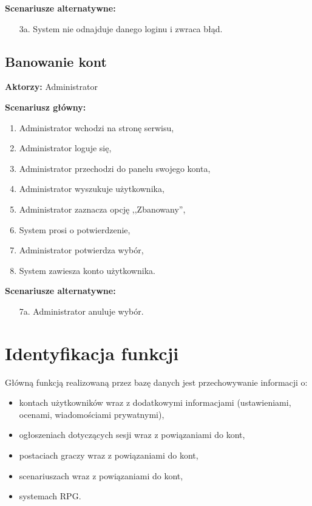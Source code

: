 \textbf{Scenariusze alternatywne:}
	\begin{enumerate}
	\item[3a.] System nie odnajduje danego loginu i zwraca błąd.
	\end{enumerate}

\subsection{Banowanie kont}

\textbf{Aktorzy:} Administrator

\textbf{Scenariusz główny:}
	\begin{enumerate}
	\item Administrator wchodzi na stronę serwisu,
	\item Administrator loguje się,
	\item Administrator przechodzi do panelu swojego konta,
	\item Administrator wyszukuje użytkownika,
	\item Administrator zaznacza opcję ,,Zbanowany'',
	\item System prosi o potwierdzenie,
	\item Administrator potwierdza wybór,	
	\item System zawiesza konto użytkownika.
	\end{enumerate}

\textbf{Scenariusze alternatywne:}
	\begin{enumerate}
	\item[7a.] Administrator anuluje wybór.
	\end{enumerate}


\section{Identyfikacja funkcji}
\label{sec:idfun}

Główną funkcją realizowaną przez bazę danych jest przechowywanie informacji o:
	\begin{itemize}
	\item kontach użytkowników wraz z dodatkowymi informacjami (ustawieniami, ocenami, wiadomościami prywatnymi),
	\item ogłoszeniach dotyczących sesji wraz z powiązaniami do kont,
	\item postaciach graczy wraz z powiązaniami do kont,
	\item scenariuszach wraz z powiązaniami do kont,
	\item systemach RPG.
	\end{itemize}

